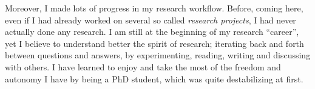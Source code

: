 Moreover, I made lots of progress in my research workflow. Before, coming here, even if I had already worked on several so called \textit{research projects}, I had never actually done any research. I am still at the beginning of my research ``career'', yet I believe to understand better the spirit of research; iterating back and forth between questions and answers, by experimenting, reading, writing and discussing with others.
I have learned to enjoy and take the most of the freedom and autonomy I have by being a PhD student, which was quite destabilizing at first.

